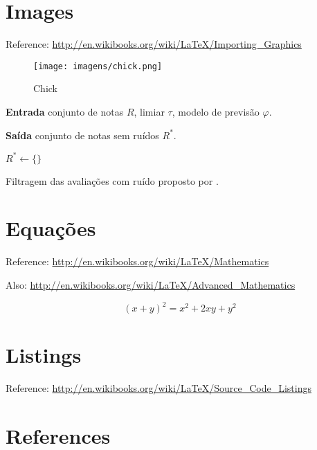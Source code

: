 \section{Images}\label{sec:LABEL_CHP_2_SEC_B}
Reference: \url{http://en.wikibooks.org/wiki/LaTeX/Importing_Graphics}

\begin{figure}
  \centering
  \texttt{[image: imagens/chick.png]}
  \caption{Chick}
  \label{fig:LABEL_FIG_1}
\end{figure}

\begin{algorithm}[H]

\textbf{Entrada} conjunto de notas $R$, limiar $\tau$, modelo de previsão $\varphi$.

\textbf{Saída} conjunto de notas sem ruídos $R^{*}$.

$R^{*} \gets \{\}$

\caption{Filtragem das avaliações com ruído proposto por \cite{OMahony2006}.}
\label{alg:mahony}
\end{algorithm}

\section{Equações}
Reference: \url{http://en.wikibooks.org/wiki/LaTeX/Mathematics}

Also: \url{http://en.wikibooks.org/wiki/LaTeX/Advanced_Mathematics}

\begin{equation}
  (x + y)^2 = x^2 + 2xy + y^2
  \label{eq:LABEL_EQ_1}
\end{equation}

\section{Listings}\label{sec:LABEL_CHP_2_SEC_D}
Reference: \url{http://en.wikibooks.org/wiki/LaTeX/Source_Code_Listings}



\section{References}\label{sec:LABEL_CHP_2_SEC_E}

